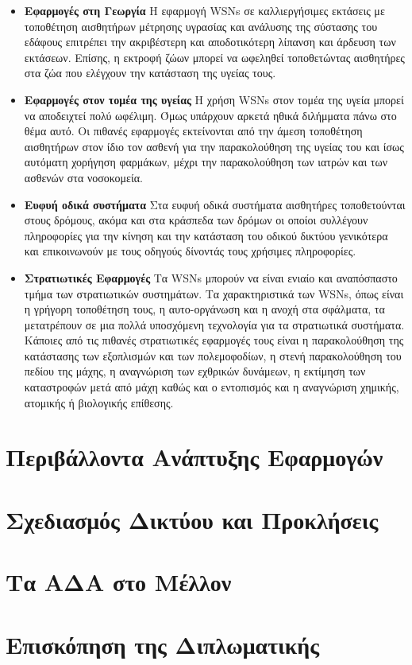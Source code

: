 \begin{itemize}
	\item \textbf{Εφαρμογές στη Γεωργία} Η εφαρμογή WSNs σε καλλιεργήσιμες εκτάσεις με τοποθέτηση αισθητήρων μέτρησης υγρασίας και ανάλυσης της σύστασης του
εδάφους επιτρέπει την ακριβέστερη και αποδοτικότερη λίπανση και άρδευση των εκτάσεων.
Επίσης, η εκτροφή ζώων μπορεί να ωφεληθεί τοποθετώντας αισθητήρες στα ζώα που ελέγχουν την κατάσταση της υγείας τους.
	\item \textbf{Εφαρμογές στον τομέα της υγείας} Η χρήση WSNs στον τομέα της υγεία μπορεί να αποδειχτεί πολύ ωφέλιμη.
Όμως υπάρχουν αρκετά ηθικά διλήμματα πάνω στο θέμα αυτό.
Οι πιθανές εφαρμογές εκτείνονται από την άμεση τοποθέτηση αισθητήρων στον ίδιο τον ασθενή για την παρακολούθηση της υγείας του και ίσως αυτόματη χορήγηση φαρμάκων,
μέχρι την παρακολούθηση των ιατρών και των ασθενών στα νοσοκομεία.
	\item \textbf{Ευφυή οδικά συστήματα} Στα ευφυή οδικά συστήματα αισθητήρες τοποθετούνται στους δρόμους, ακόμα και στα κράσπεδα των δρόμων οι οποίοι
συλλέγουν πληροφορίες για την κίνηση και την κατάσταση του οδικού δικτύου γενικότερα και επικοινωνούν με τους οδηγούς δίνοντάς τους χρήσιμες πληροφορίες.
	\item \textbf{Στρατιωτικές Εφαρμογές} Τα WSNs μπορούν να είναι ενιαίο και αναπόσπαστο τμήμα των στρατιωτικών συστημάτων.
Τα χαρακτηριστικά των WSNs, όπως είναι η γρήγορη τοποθέτηση τους, η αυτο-οργάνωση και η ανοχή στα σφάλματα, τα μετατρέπουν σε μια πολλά υποσχόμενη τεχνολογία για τα
στρατιωτικά συστήματα.
Κάποιες από τις πιθανές στρατιωτικές εφαρμογές τους είναι η παρακολούθηση της κατάστασης των εξοπλισμών και των πολεμοφοδίων, η στενή παρακολούθηση του πεδίου της
μάχης, η αναγνώριση των εχθρικών δυνάμεων, η εκτίμηση των καταστροφών μετά από μάχη καθώς και ο εντοπισμός και η αναγνώριση χημικής, ατομικής ή βιολογικής επίθεσης.
\end{itemize}




\section{Περιβάλλοντα Ανάπτυξης Εφαρμογών}

\section{Σχεδιασμός Δικτύου και Προκλήσεις}

\section{Τα ΑΔΑ στο Μέλλον}
\section{Επισκόπηση της Διπλωματικής}

\label{ch:wsns}